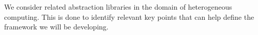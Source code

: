 We consider related abstraction libraries in the domain of heterogeneous computing. This is done to identify relevant key points that can help define the framework we will be developing.